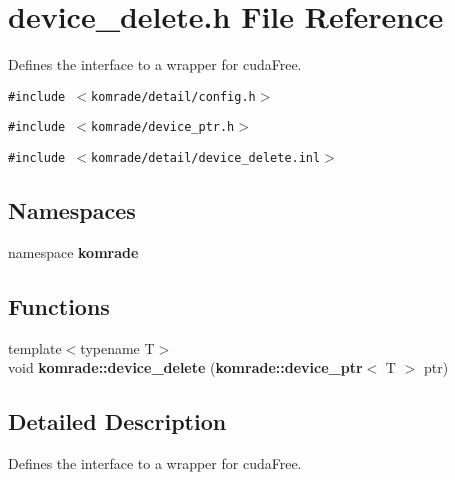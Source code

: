 \section{device\_\-delete.h File Reference}
\label{device__delete_8h}
Defines the interface to a wrapper for cudaFree. 

{\tt \#include $<$komrade/detail/config.h$>$}\par
{\tt \#include $<$komrade/device\_\-ptr.h$>$}\par
{\tt \#include $<$komrade/detail/device\_\-delete.inl$>$}\par
\subsection*{Namespaces}
\begin{CompactItemize}
\item 
namespace {\bf komrade}
\end{CompactItemize}
\subsection*{Functions}
\begin{CompactItemize}
\item 
{\footnotesize template$<$typename T$>$ }\\void {\bf komrade::device\_\-delete} ({\bf komrade::device\_\-ptr}$<$ T $>$ ptr)
\end{CompactItemize}


\subsection{Detailed Description}
Defines the interface to a wrapper for cudaFree. 

